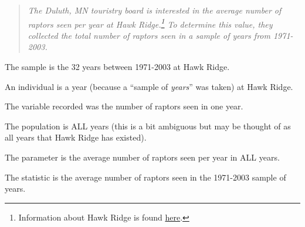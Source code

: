\documentclass[10pt,openany]{book}\usepackage[]{graphicx}\usepackage[]{color}
\begin{document}
\begin{quote}
\textit{The Duluth, MN touristry board is interested in the average number of raptors seen per year at Hawk Ridge.\footnote{Information about Hawk Ridge is found \href{http://www.hawkridge.org/}{here}.}  To determine this value, they collected the total number of raptors seen in a sample of years from 1971-2003.}
\end{quote}

\begin{Itemize}
  \item The sample is the 32 years between 1971-2003 at Hawk Ridge.
  \item An individual is a year (because a ``sample of \emph{years}'' was taken) at Hawk Ridge.
  \item The variable recorded was the number of raptors seen in one year.
  \item The population is ALL years (this is a bit ambiguous but may be thought of as all years that Hawk Ridge has existed).
  \item The parameter is the average number of raptors seen per year in ALL years.
  \item The statistic is the average number of raptors seen in the 1971-2003 sample of years.
\end{Itemize}
\end{document}
